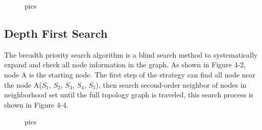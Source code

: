 \documentclass[conference]{IEEEtran}
\begin{document}
\begin{figure}[htbp]
    \centering
    \centering
    \caption{ pics}
\end{figure}

\subsection{Depth First Search}
\par
The breadth priority search algorithm is a blind search method to systematically expand and check all node information in the graph. As shown in Figure 4-2, node A is the starting node. The first step of the strategy can find all node near the node A($S_1$, $S_2$, $S_3$, $S_4$, $S_5$), then search second-order neighbor of nodes in neighborhood set until the full topology graph is traveled, this search process is shown in Figure 4-4.

\begin{figure}[htbp]
    \centering
    \centering
    \caption{ pics}
\end{figure}
\end{document}
